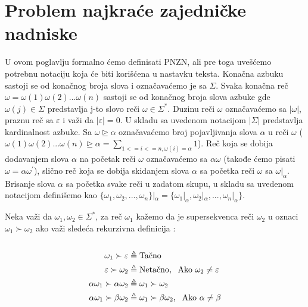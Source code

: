 \documentclass[12pt,oneside]{memoir}
\begin{document}
\section{Problem najkraće zajedničke nadniske}
U ovom poglavlju formalno ćemo definisati PNZN, ali pre toga uvešćemo potrebnu notaciju koja će biti korišćena u nastavku
teksta. Konačna azbuku sastoji se od konačnog broja slova i označavaćemo je sa $\Sigma$. Svaka konačna reč
$\omega=\omega(1)\omega(2)...\omega(n)$ sastoji se od konačnog broja slova azbuke gde $\omega(j)\in\Sigma$ predstavlja j-to slovo reči $\omega\in\Sigma^*$.
Duzinu reči $\omega$ označavaćemo sa $|\omega|$, praznu reč sa $\varepsilon$ i važi da $|\varepsilon|=0$. U skladu sa uvedenom
notacijom $|\Sigma|$ predstavlja kardinalnost azbuke. Sa $\omega\unrhd\alpha$ označavaćemo broj pojavljivanja slova $\alpha$
u reči $\omega$ ($\omega(1)\omega(2)...\omega(n)\unrhd\alpha=\sum_{1<=i<=n,\omega(i)=\alpha}1$). Reč koja se dobija dodavanjem
slova $\alpha$ na početak reči $\omega$ označavaćemo sa $\alpha\omega$ (takođe ćemo pisati $\omega=\alpha\omega^{'}$), slično reč koja se dobija skidanjem slova $\alpha$ sa početka
reči $\omega$ sa $\omega|_{\alpha}$. Brisanje slova $\alpha$ sa početka svake reči u zadatom skupu, u skladu sa uvedenom notacijom
definišemo kao $\{\omega_{1},\omega_{2},...,\omega_{n}\}|_{\alpha}=\{\omega_{1}|_{\alpha},\omega_{2}|_{\alpha},...,\omega_{n}|_{\alpha}\}$.

Neka važi da $\omega_{1},\omega_{2}\in\Sigma^*$, za reč $\omega_{1}$ kažemo da je
supersekvenca reči $\omega_{2}$ u oznaci $\omega_{1}\succ\omega_{2}$ ako važi sledeća rekurzivna definicija \cite{ProbabilisticBS}:
\\
\\
\begin{equation}
\begin{aligned}
\omega_{1}\succ\varepsilon &\triangleq \textrm{Tačno}\\
\varepsilon\succ\omega_{2} &\triangleq \textrm{Netačno, \:\:Ako } \omega_{2}\neq\varepsilon\\
\alpha\omega_{1}\succ\alpha\omega_{2} &\triangleq \omega_{1}\succ\omega_{2}\\
\alpha\omega_{1}\succ\beta\omega_{2} &\triangleq \omega_{1}\succ\beta\omega_{2} \textrm{, \:\:Ako } \alpha\neq\beta
\end{aligned}
\end{equation}
\\
\end{document}
